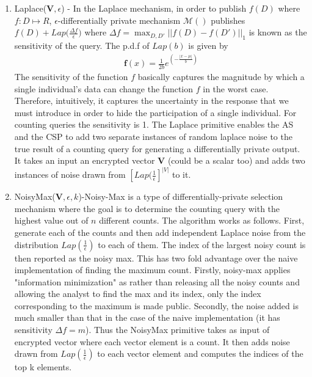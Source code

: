 \begin{enumerate}
	\item Laplace($\mathbf{V},\epsilon$) - In the Laplace mechanism, in order
to publish $f(D)$ where $f : D \mapsto R$, $\epsilon$-differentially private mechanism $\mathcal{M()}$ 
publishes $f(D) + Lap\Big(\frac{\Delta f}{\epsilon}\Big)$  
where $\Delta f = \max_{D,D'}||f(D)-f(D')||_1$ is known as the sensitivity of the query. The p.d.f of $Lap(b)$ is given by\begin{gather}\mathbf{f}(x)={\frac  {1}{2b}}e^{ \left(-{\frac  {|x-\mu |}{b}}\right)}\end{gather} The sensitivity of the function $f$ basically captures the magnitude by which a single individual’s data can change the function $f$ in the worst case. Therefore, intuitively, it captures the uncertainty in the response that we must introduce in order to hide the participation of a single individual. For counting queries the sensitivity is 1. The \textsf{Laplace} primitive enables the \textsf{AS} and the \textsf{CSP} to add two separate instances of random laplace noise to the true result of a counting query for generating a differentially private output. It takes an input an encrypted vector $\mathbf{V}$ (could be a scalar too) and adds two instances of noise drawn from $[Lap(\frac{1}{\epsilon}]^{|V|}$ to it.

	\item \textsf{NoisyMax}($\mathbf{V},\epsilon, k$)-Noisy-Max is a type of differentially-private selection mechanism where the goal is to determine the counting query with the highest value out of $n$ different counts.  
	The algorithm works as follows. First, generate each of the counts and then add independent Laplace noise from the distribution $Lap(\frac{1}{\epsilon})$ to each of them. The index of the largest noisy count is then reported as the noisy max.
	This has two fold advantage over the naive implementation of finding the maximum count.
Firstly, noisy-max applies "information minimization" as rather than releasing all the noisy counts
and allowing the analyst to find the max and its index, only the
index corresponding to the maximum is made public.
Secondly, the noise added is much smaller than that in the case of the naive implementation (it has sensitivity $\Delta f=m$). Thus the \textsf{NoisyMax} primitive takes as input of encrypted vector where each vector element is a count. It then adds noise drawn from $Lap(\frac{1}{\epsilon})$ to each vector element and computes the indices of the top k elements.
\end{enumerate}
